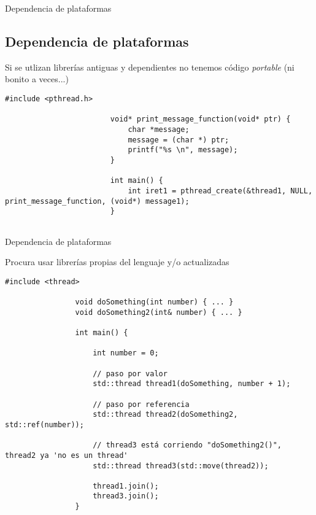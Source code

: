 \documentclass{beamer}
\newcommand{\normalSizeItem}[1] {
  \normalsize{\item #1}
}
\newcommand{\smallCite}[1]{
	\begin{small}
		\cite{#1}	
	\end{small}
}
\begin{document}
		\begin{frame}[fragile]{Dependencia de plataformas}	
			\subsection{Dependencia de plataformas}		
			\begin{itemize}
				\normalSizeItem { Si se utlizan librerías antiguas y dependientes no tenemos código \textit{portable} (ni bonito a veces...) \smallCite{posixThreads}}
						\begin{lstlisting}[basicstyle={\tiny\ttfamily}]
						#include <pthread.h>
		
						void* print_message_function(void* ptr) {
							char *message;
							message = (char *) ptr;
							printf("%s \n", message);
						}
						
						int main() {
							int iret1 = pthread_create(&thread1, NULL, print_message_function, (void*) message1);
						}
		
						\end{lstlisting}
			\end{itemize}
		\end{frame}
		
		\begin{frame}[fragile]{Dependencia de plataformas}	
			\begin{itemize}

				\normalSizeItem { Procura usar librerías propias del lenguaje y/o actualizadas }
				\begin{lstlisting}[basicstyle={\tiny\ttfamily}]
				#include <thread>
				
				void doSomething(int number) { ... }
				void doSomething2(int& number) { ... }
				
				int main() {
				
					int number = 0;
					
					// paso por valor
					std::thread thread1(doSomething, number + 1); 
					
					// paso por referencia
					std::thread thread2(doSomething2, std::ref(number)); 
					
					// thread3 está corriendo "doSomething2()", thread2 ya 'no es un thread'
					std::thread thread3(std::move(thread2)); 
					
					thread1.join();
					thread3.join();					
				}
				
				\end{lstlisting}
				
			\end{itemize}
		\end{frame}
		
\end{document}
